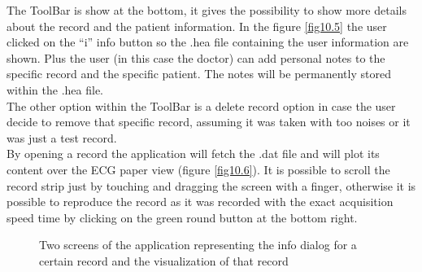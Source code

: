 The ToolBar is show at the bottom, it gives the possibility to show more details about the record and the patient information. In the figure \ref{fig10.5} the user clicked on the “i” info button so the .hea file containing the user information are shown. Plus the user (in this case the doctor) can add personal notes to the specific record and the specific patient. The notes will be permanently stored within the .hea file.\\
The other option within the ToolBar is a delete record option in case the user decide to remove that specific record, assuming it was taken with too noises or it was just a test record.\\
By opening a record the application will fetch the .dat file and will plot its content over the ECG paper view (figure \ref{fig10.6}). It is possible to scroll the record strip just by touching and dragging the screen with a finger, otherwise it is possible to reproduce the record as it was recorded with the exact acquisition speed time by clicking on the green round button at the bottom right.\\
\begin{figure}[!htb]
	\centering
	\qquad 
	\caption{Two screens of the application representing the info dialog for a certain record and the visualization of that record}  
	\label{fig10.7ab}
\end{figure}
